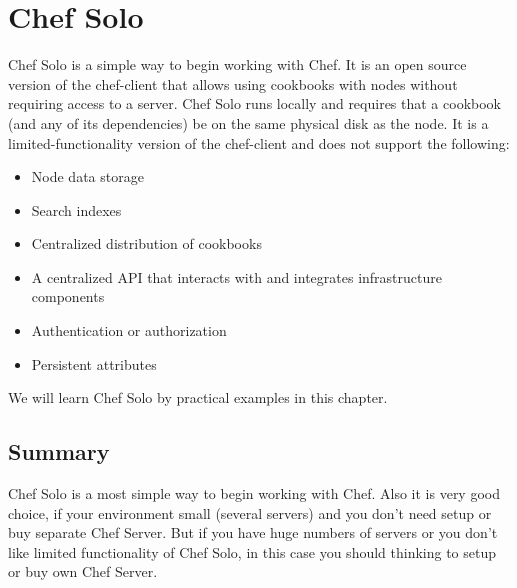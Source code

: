 \chapter{Chef Solo}

Chef Solo is a simple way to begin working with Chef. It is an open source version of the chef-client that allows using cookbooks with nodes without requiring access to a server. Chef Solo runs locally and requires that a cookbook (and any of its dependencies) be on the same physical disk as the node. It is a limited-functionality version of the chef-client and does not support the following:

\begin{itemize}
  \item Node data storage
  \item Search indexes
  \item Centralized distribution of cookbooks
  \item A centralized API that interacts with and integrates infrastructure components
  \item Authentication or authorization
  \item Persistent attributes
\end{itemize}

We will learn Chef Solo by practical examples in this chapter.













\section{Summary}

Chef Solo is a most simple way to begin working with Chef. Also it is very good choice, if your environment small (several servers) and you don't need setup or buy separate Chef Server. But if you have huge numbers of servers or you don't like limited functionality of Chef Solo, in this case you should thinking to setup or buy own Chef Server.

